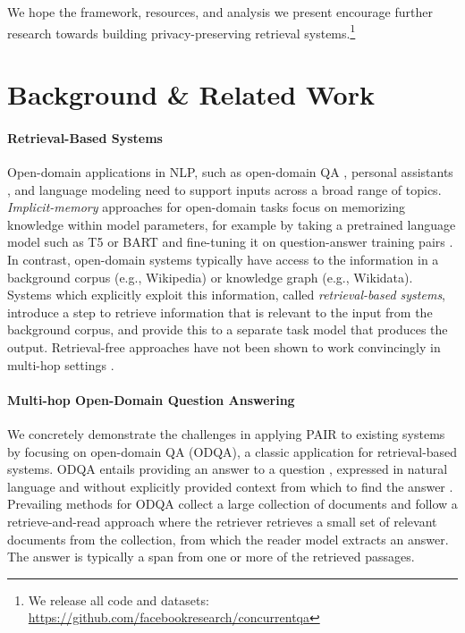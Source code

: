 \documentclass{article}
\renewcommand\cite{\citep}	\newcommand\shortcite{\citeyearpar}\newcommand\newcite{\citet}
\newcommand{\problemshortname}{\textsc{PAIR}\xspace}
\begin{document}
We hope the framework, resources, and analysis we present encourage further research towards building privacy-preserving retrieval systems.\footnote{We release all code and datasets: \url{https://github.com/facebookresearch/concurrentqa}}
 
\section{Background \& Related Work}

\label{sec:background}
\paragraph{Retrieval-Based Systems}
Open-domain applications in NLP, such as open-domain QA \cite{voorhees1999trec,chen2017retrieveread}, personal assistants \cite{dinan2019wow}, and language modeling \cite{borgeaud2021retro} need to support inputs across a broad range of topics.
\textit{Implicit-memory} approaches for open-domain tasks focus on memorizing knowledge within model parameters, for example by taking a pretrained language model such as T5 or BART and fine-tuning it on question-answer training pairs \cite{roberts2020t5}. 
In contrast, open-domain systems typically have access to the information in a background corpus (e.g., Wikipedia) or knowledge graph (e.g., Wikidata). Systems which explicitly exploit this information, called \textit{retrieval-based systems}, introduce a step to retrieve information that is relevant to the input from the background corpus, and provide this to a separate task model that produces the output. Retrieval-free approaches have not been shown to work convincingly in multi-hop settings \cite{xiong2021mdr}.

\paragraph{Multi-hop Open-Domain Question Answering}
We concretely demonstrate the challenges in applying \problemshortname to existing systems by focusing on open-domain QA (ODQA), a classic application for retrieval-based systems. ODQA entails providing an answer  to a  question , expressed in natural language and without explicitly provided context from which to find the answer \cite{voorhees1999trec}. Prevailing methods for ODQA collect a large collection of documents  and follow a retrieve-and-read approach \cite[][inter alia.]{chen2017retrieveread} where the retriever retrieves a small set of relevant documents from the collection, from which the reader model extracts an answer. The answer is typically a span from one or more of the retrieved passages.
\end{document}
